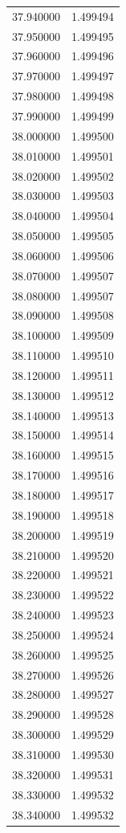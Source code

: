 \begin{tabular}{rr}
37.940000 & 1.499494 \\
37.950000 & 1.499495 \\
37.960000 & 1.499496 \\
37.970000 & 1.499497 \\
37.980000 & 1.499498 \\
37.990000 & 1.499499 \\
38.000000 & 1.499500 \\
38.010000 & 1.499501 \\
38.020000 & 1.499502 \\
38.030000 & 1.499503 \\
38.040000 & 1.499504 \\
38.050000 & 1.499505 \\
38.060000 & 1.499506 \\
38.070000 & 1.499507 \\
38.080000 & 1.499507 \\
38.090000 & 1.499508 \\
38.100000 & 1.499509 \\
38.110000 & 1.499510 \\
38.120000 & 1.499511 \\
38.130000 & 1.499512 \\
38.140000 & 1.499513 \\
38.150000 & 1.499514 \\
38.160000 & 1.499515 \\
38.170000 & 1.499516 \\
38.180000 & 1.499517 \\
38.190000 & 1.499518 \\
38.200000 & 1.499519 \\
38.210000 & 1.499520 \\
38.220000 & 1.499521 \\
38.230000 & 1.499522 \\
38.240000 & 1.499523 \\
38.250000 & 1.499524 \\
38.260000 & 1.499525 \\
38.270000 & 1.499526 \\
38.280000 & 1.499527 \\
38.290000 & 1.499528 \\
38.300000 & 1.499529 \\
38.310000 & 1.499530 \\
38.320000 & 1.499531 \\
38.330000 & 1.499532 \\
38.340000 & 1.499532 \\

\end{tabular}
